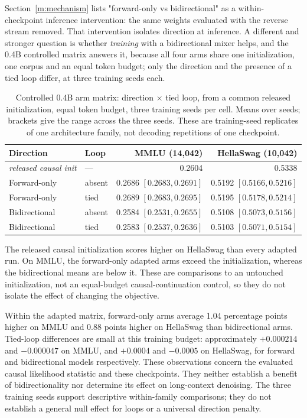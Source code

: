 Section~\ref{m:mechanism} lists "forward-only vs bidirectional" as a within-checkpoint
inference intervention: the same weights evaluated with the reverse stream removed. That
intervention isolates direction at inference. A different and stronger question is whether
\emph{training} with a bidirectional mixer helps, and the 0.4B controlled matrix answers
it, because all four arms share one initialization, one corpus and an equal token budget;
only the direction and the presence of a tied loop differ, at three training seeds each.

\begin{table}[t]
\centering\small
\caption{Controlled 0.4B arm matrix: direction $\times$ tied loop, from a common released
initialization, equal token budget, three training seeds per cell. Means over seeds;
brackets give the range across the three seeds. These are training-seed replicates of one
architecture family, not decoding repetitions of one checkpoint.}
\begin{tabular}{@{}llrr@{}}
\toprule
Direction & Loop & MMLU (14{,}042) & HellaSwag (10{,}042)\\
\midrule
\emph{released causal init} & --- & 0.2604 & 0.5338\\
\midrule
Forward-only & absent & 0.2686 $[0.2683,0.2691]$ & 0.5192 $[0.5166,0.5216]$\\
Forward-only & tied & 0.2689 $[0.2683,0.2695]$ & 0.5195 $[0.5178,0.5214]$\\
Bidirectional & absent & 0.2584 $[0.2531,0.2655]$ & 0.5108 $[0.5073,0.5156]$\\
Bidirectional & tied & 0.2583 $[0.2537,0.2636]$ & 0.5103 $[0.5071,0.5154]$\\
\bottomrule
\end{tabular}
\label{tab:direction}
\end{table}

The released causal initialization scores higher on HellaSwag than every adapted run. On MMLU, the forward-only adapted arms exceed the initialization, whereas the bidirectional means are below it. These are comparisons to an untouched initialization, not an equal-budget causal-continuation control, so they do not isolate the effect of changing the objective.

Within the adapted matrix, forward-only arms average 1.04 percentage points higher on MMLU and 0.88 points higher on HellaSwag than bidirectional arms. Tied-loop differences are small at this training budget: approximately $+0.000214$ and $-0.000047$ on MMLU, and $+0.0004$ and $-0.0005$ on HellaSwag, for forward and bidirectional models respectively. These observations concern the evaluated causal likelihood statistic and these checkpoints. They neither establish a benefit of bidirectionality nor determine its effect on long-context denoising. The three training seeds support descriptive within-family comparisons; they do not establish a general null effect for loops or a universal direction penalty.

